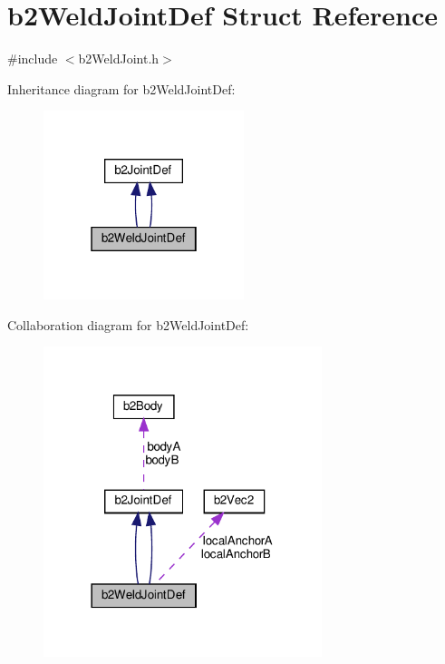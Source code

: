 \hypertarget{structb2WeldJointDef}{}\section{b2\+Weld\+Joint\+Def Struct Reference}
\label{structb2WeldJointDef}


{\ttfamily \#include $<$b2\+Weld\+Joint.\+h$>$}



Inheritance diagram for b2\+Weld\+Joint\+Def\+:
\nopagebreak
\begin{figure}[H]
\begin{center}
\leavevmode
\includegraphics[width=166pt]{structb2WeldJointDef__inherit__graph}
\end{center}
\end{figure}


Collaboration diagram for b2\+Weld\+Joint\+Def\+:
\nopagebreak
\begin{figure}[H]
\begin{center}
\leavevmode
\includegraphics[width=230pt]{structb2WeldJointDef__coll__graph}
\end{center}
\end{figure}
